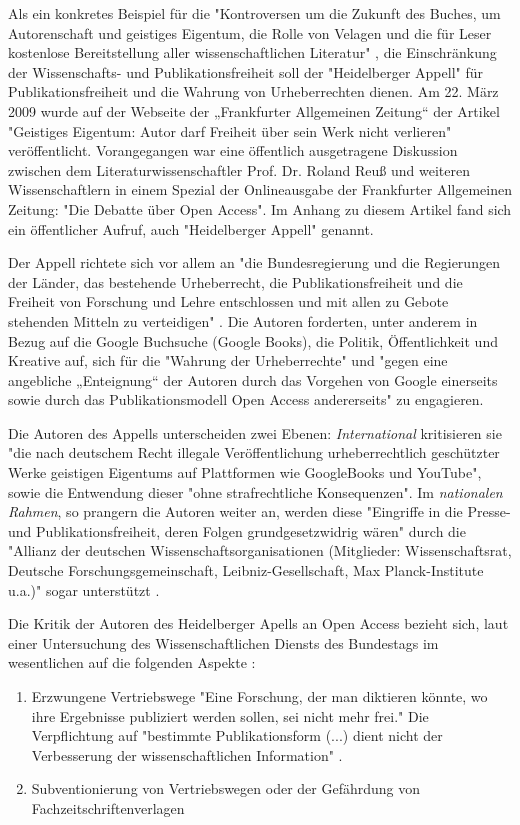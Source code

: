 Als ein konkretes Beispiel für die "Kontroversen um die Zukunft des Buches, um Autorenschaft und geistiges Eigentum, die Rolle von Velagen und die für Leser kostenlose Bereitstellung aller wissenschaftlichen Literatur" \cite{hagner_2015_sache_buches}, die Einschränkung der Wissenschafts- und Publikationsfreiheit soll der "Heidelberger Appell" für Publikationsfreiheit und die Wahrung von Urheberrechten dienen. Am 22. März 2009 wurde auf der Webseite der „Frankfurter Allgemeinen Zeitung“ der Artikel "Geistiges Eigentum: Autor darf Freiheit über sein Werk nicht verlieren" \cite{faz_heidelberger_apell_2009} veröffentlicht. Vorangegangen war eine öffentlich ausgetragene Diskussion zwischen dem Literaturwissenschaftler Prof. Dr. Roland Reuß und weiteren Wissenschaftlern in einem Spezial der Onlineausgabe der Frankfurter Allgemeinen Zeitung: "Die Debatte über Open Access". Im Anhang zu diesem Artikel fand sich ein öffentlicher Aufruf, auch "Heidelberger Appell" genannt.

Der Appell richtete sich vor allem an "die Bundesregierung und die Regierungen der Länder, das bestehende Urheberrecht, die Publikationsfreiheit und die Freiheit von Forschung und Lehre entschlossen und mit allen zu Gebote stehenden Mitteln zu verteidigen" \cite{ITK_2009}. Die Autoren forderten, unter anderem in Bezug auf die Google Buchsuche (Google Books), die Politik, Öffentlichkeit und Kreative auf, sich für die "Wahrung der Urheberrechte" und "gegen eine angebliche „Enteignung“ der Autoren durch das Vorgehen von Google einerseits sowie durch das Publikationsmodell Open Access andererseits" \cite{WD_bundestag_2009} zu engagieren.

Die Autoren des Appells unterscheiden zwei Ebenen: \textit{International} kritisieren sie "die nach deutschem Recht illegale Veröffentlichung urheberrechtlich geschützter Werke geistigen Eigentums auf Plattformen wie GoogleBooks und YouTube", sowie die Entwendung dieser "ohne strafrechtliche Konsequenzen". Im \textit{nationalen Rahmen}, so prangern die Autoren weiter an, werden diese "Eingriffe in die Presse- und Publikationsfreiheit, deren Folgen grundgesetzwidrig wären" durch die "Allianz der deutschen Wissenschaftsorganisationen (Mitglieder: Wissenschaftsrat, Deutsche Forschungsgemeinschaft, Leibniz-Gesellschaft, Max Planck-Institute u.a.)" sogar unterstützt \cite{ITK_2009}.

Die Kritik der Autoren des Heidelberger Apells an Open Access bezieht sich, laut einer Untersuchung des Wissenschaftlichen Diensts des Bundestags im wesentlichen auf die folgenden Aspekte \cite{WD_bundestag_2009}:
\begin{enumerate}
\item Erzwungene Vertriebswege
"Eine Forschung, der man diktieren könnte, wo ihre Ergebnisse publiziert werden sollen, sei nicht mehr frei." Die Verpflichtung auf "bestimmte Publikationsform (...) dient nicht der Verbesserung der wissenschaftlichen Information" \cite{ITK_2009}.
\item Subventionierung von Vertriebswegen oder der Gefährdung von Fachzeitschriftenverlagen
\end{enumerate}

